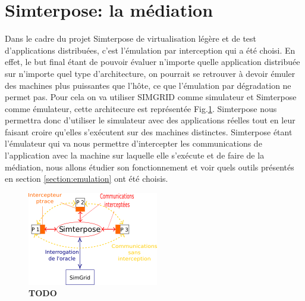 
\section{Simterpose: la médiation}
\label{section:simterpose}


Dans le cadre du projet Simterpose de virtualisation légère et de test
d'applications distribuées, c'est l'émulation par interception qui a été
choisi. En effet, le but final étant de pouvoir évaluer n'importe quelle
application distribuée sur n'importe quel type d'architecture, on pourrait se
retrouver à devoir émuler des machines plus puissantes que l'hôte, ce que
l'émulation par dégradation ne permet pas. Pour cela on va utiliser SIMGRID
comme simulateur et Simterpose comme émulateur, cette architecure est représentée Fig.\ref{Organisation_generale}. Simterpose nous permettra donc
d'utiliser le simulateur avec des applications réelles tout en leur faisant
croire qu'elles s'exécutent sur des machines distinctes. Simterpose étant
l'émulateur qui va nous permettre d'intercepter les communications de
l'application avec la machine sur laquelle elle s'exécute et de faire de la
médiation, nous allons étudier son fonctionnement et voir quels outils présentés
en section \ref{section:emulation} ont été choisis.

\begin{figure}[H]
  \centering
  \includegraphics{Pictures/png/Communications_Simterpose_interprocess_v2}
  \caption{{\color{red} \textbf{TODO}}}
  \label{Organisation_generale}
\end{figure}

